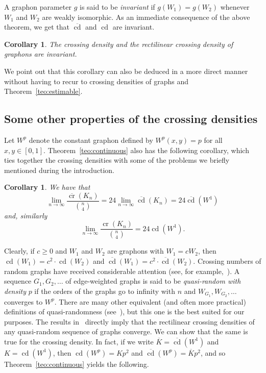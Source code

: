 \documentclass{article}
\newcounter{contSect} \numberwithin{contSect}{section}
\newtheorem{corollary}[contSect]{Corollary}
\begin{document}
A graphon parameter $g$ is said to be \textit{invariant} if $g(W_1)=g(W_2)$ whenever $W_1$ and $W_2$ are weakly isomorphic. As an immediate consequence of the above theorem, we get that $\overline{\mathop{\mathrm{cd}}}$ and $\mathop{\mathrm{cd}}$ are invariant. 

\begin{corollary}\label{teo:invariant}
    The crossing density and the rectilinear crossing density of graphons are invariant. 
\end{corollary}

We point out that this corollary can also be deduced in a more direct manner without having to recur to crossing densities of graphs and Theorem~\ref{teo:estimable}.

\subsection{Some other properties of the crossing densities}

Let $W^p$ denote the constant graphon  defined by $W^p(x,y)=p$ for all $x,y\in[0,1]$. Theorem~\ref{teo:continuous} also has the following corollary, which ties together the crossing densities with some of the problems we briefly mentioned during the introduction.

\begin{corollary}\label{teo:W1}
    We have that \[\lim_{n\rightarrow\infty}\frac{\overline{\mathop{\mathrm{cr}}}(K_n)}{\binom{n}{4}}=24\lim_{n\rightarrow\infty}\overline{\mathop{\mathrm{cd}}}(K_n)=24\overline{\mathop{\mathrm{cd}}}(W^1)\] and, similarly \[\lim_{n\rightarrow\infty}\frac{\mathop{\mathrm{cr}}(K_n)}{\binom{n}{4}}=24\mathop{\mathrm{cd}}(W^1).\]
\end{corollary}

Clearly, if $c\geq0$ and $W_1$ and $W_2$ are graphons with $W_1=cW_2$, then $\mathop{\mathrm{cd}}(W_1)=c^2\cdot\mathop{\mathrm{cd}}(W_2)$ and $\overline{\mathop{\mathrm{cd}}}(W_1)=c^2\cdot\overline{\mathop{\mathrm{cd}}}(W_2)$. Crossing numbers of random graphs have received considerable attention (see, for example,~\cite{cr_random}). A sequence $G_1,G_2,\dots$ of edge-weighted graphs is said to be \textit{quasi-random with density} $p$ if the orders of the graphs go to infinity with $n$ and $W_{G_1},W_{G_2},\dots$ converges to $W^p$. There are many other equivalent (and often more practical) definitions of quasi-randomness (see~\cite{quasi-random,lovaszlimits}), but this one is the best suited for our purposes. The results in~\cite{approximatingrect} directly imply that the rectilinear crossing densities of any quasi-random sequence of graphs converge. We can show that the same is true for the crossing density. In fact, if we write $\overline{K}=\overline{\mathop{\mathrm{cd}}}(W^1)$ and $K=\mathop{\mathrm{cd}}(W^1)$, then $\mathop{\mathrm{cd}}(W^p)=Kp^2$ and $\overline{\mathop{\mathrm{cd}}}(W^p)=\overline{K}p^2$, and so Theorem~\ref{teo:continuous} yields the following.
\end{document}

